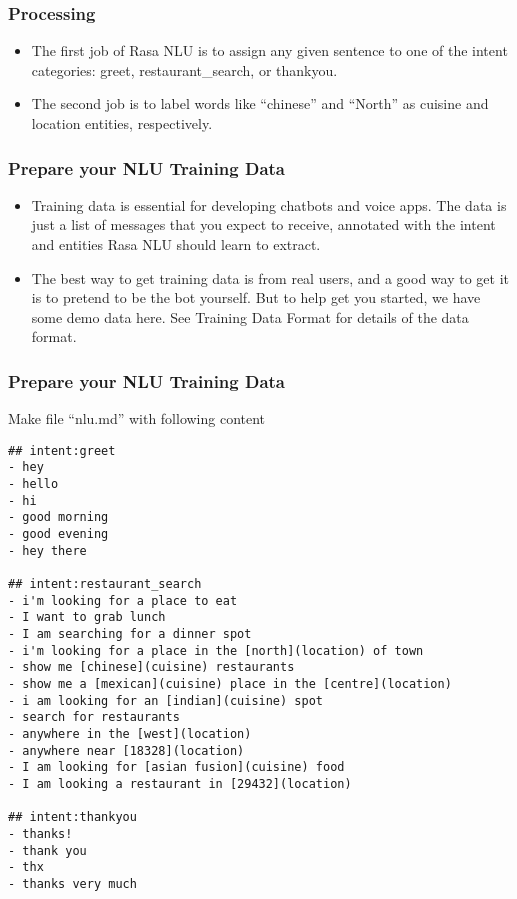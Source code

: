  \begin{frame}[fragile]\frametitle{Processing}
\begin{itemize}
\item The first job of Rasa NLU is to assign any given sentence to one of the intent categories: greet, restaurant\_search, or thankyou.
\item The second job is to label words like ``chinese'' and ``North'' as cuisine and location entities, respectively. 
\end{itemize}
\end{frame}

 \begin{frame}[fragile]\frametitle{Prepare your NLU Training Data}
\begin{itemize}
\item Training data is essential for developing chatbots and voice apps. The data is just a list of messages that you expect to receive, annotated with the intent and entities Rasa NLU should learn to extract.
\item The best way to get training data is from real users, and a good way to get it is to pretend to be the bot yourself. But to help get you started, we have some demo data here. See Training Data Format for details of the data format.
\end{itemize}
\end{frame}

 \begin{frame}[fragile]\frametitle{Prepare your NLU Training Data}
 Make file ``nlu.md'' with following content
 \scriptsize
\begin{lstlisting}
## intent:greet
- hey
- hello
- hi
- good morning
- good evening
- hey there

## intent:restaurant_search
- i'm looking for a place to eat
- I want to grab lunch
- I am searching for a dinner spot
- i'm looking for a place in the [north](location) of town
- show me [chinese](cuisine) restaurants
- show me a [mexican](cuisine) place in the [centre](location)
- i am looking for an [indian](cuisine) spot
- search for restaurants
- anywhere in the [west](location)
- anywhere near [18328](location)
- I am looking for [asian fusion](cuisine) food
- I am looking a restaurant in [29432](location)

## intent:thankyou
- thanks!
- thank you
- thx
- thanks very much
\end{lstlisting}
\end{frame}


